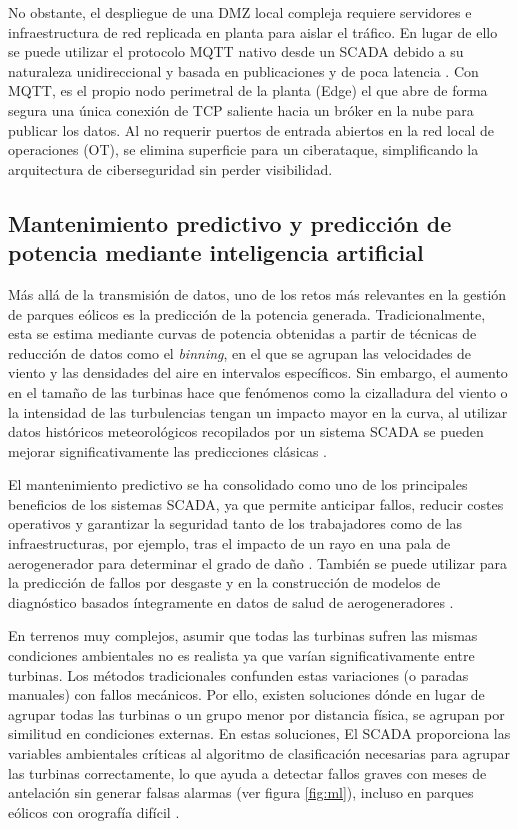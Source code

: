 No obstante, el despliegue de una \ac{DMZ} local compleja requiere servidores e infraestructura de red replicada en planta para aislar el tráfico. En lugar de ello se puede utilizar el protocolo \ac{MQTT} nativo desde un \ac{SCADA} debido a su naturaleza unidireccional y basada en publicaciones y de poca latencia \cite{ferrari2020evaluation}. Con \ac{MQTT}, es el propio nodo perimetral de la planta (Edge) el que abre de forma segura una única conexión de \ac{TCP} saliente hacia un bróker en la nube para publicar los datos. Al no requerir puertos de entrada abiertos en la red local de operaciones (OT), se elimina superficie para un ciberataque, simplificando la arquitectura de ciberseguridad sin perder visibilidad.\par

\subsection{Mantenimiento predictivo y predicción de potencia mediante inteligencia artificial}
Más allá de la transmisión de datos, uno de los retos más relevantes en la gestión de parques eólicos es la predicción de la potencia generada. Tradicionalmente, esta se estima mediante curvas de potencia obtenidas a partir de técnicas de reducción de datos como el \textit{binning}, en el que se agrupan las velocidades de viento y las densidades del aire en intervalos específicos. Sin embargo, el aumento en el tamaño de las turbinas hace que fenómenos como la cizalladura del viento o la intensidad de las turbulencias tengan un impacto mayor en la curva, al utilizar datos históricos meteorológicos recopilados por un sistema \ac{SCADA} se pueden mejorar significativamente las predicciones clásicas \cite{Pandit2023}.

El mantenimiento predictivo se ha consolidado como uno de los principales beneficios de los sistemas \ac{SCADA}, ya que permite anticipar fallos, reducir costes operativos y garantizar la seguridad tanto de los trabajadores como de las infraestructuras, por ejemplo, tras el impacto de un rayo en una pala de aerogenerador para determinar el grado de daño \cite{Matsui2021}. También se puede utilizar para la predicción de fallos por desgaste y en la construcción de modelos de diagnóstico basados íntegramente en datos de salud de aerogeneradores \cite{Khan2024} \cite{Shi2021}.

En terrenos muy complejos, asumir que todas las turbinas sufren las mismas condiciones ambientales no es realista ya que varían significativamente entre turbinas. Los métodos tradicionales confunden estas variaciones (o paradas manuales) con fallos mecánicos. Por ello, existen soluciones dónde en lugar de agrupar todas las turbinas o un grupo menor por distancia física, se agrupan por similitud en condiciones externas. En estas soluciones, El \ac{SCADA} proporciona las variables ambientales críticas al algoritmo de clasificación necesarias para agrupar las turbinas correctamente, lo que ayuda a detectar fallos graves con meses de antelación sin generar falsas alarmas (ver figura \ref{fig:ml}), incluso en parques eólicos con orografía difícil \cite{Du2023}.


